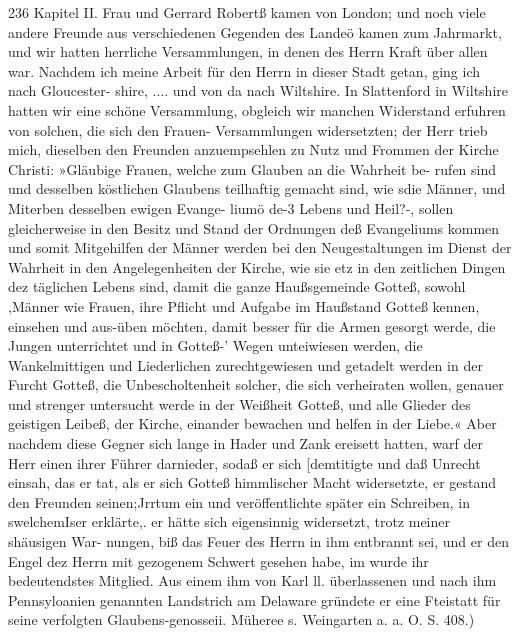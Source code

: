 236 Kapitel II.
Frau und Gerrard Robertß kamen von London; und noch viele
andere Freunde aus verschiedenen Gegenden des Landeö kamen
zum Jahrmarkt, und wir hatten herrliche Versammlungen, in
denen des Herrn Kraft über allen war. Nachdem ich meine
Arbeit für den Herrn in dieser Stadt getan, ging ich nach Gloucester-
shire, .... und von da nach Wiltshire. In Slattenford in
Wiltshire hatten wir eine schöne Versammlung, obgleich wir
manchen Widerstand erfuhren von solchen, die sich den Frauen-
Versammlungen widersetzten; der Herr trieb mich, dieselben den
Freunden anzuempsehlen zu Nutz und Frommen der Kirche Christi:
»Gläubige Frauen, welche zum Glauben an die Wahrheit be-
rufen sind und desselben köstlichen Glaubens teilhaftig gemacht
sind, wie sdie Männer, und Miterben desselben ewigen Evange-
liumö de-3 Lebens und Heil?-, sollen gleicherweise in den Besitz
und Stand der Ordnungen deß Evangeliums kommen und somit
Mitgehilfen der Männer werden bei den Neugestaltungen im
Dienst der Wahrheit in den Angelegenheiten der Kirche, wie sie
etz in den zeitlichen Dingen dez täglichen Lebens sind, damit
die ganze Haußsgemeinde Gotteß, sowohl ,Männer wie Frauen,
ihre Pflicht und Aufgabe im Haußstand Gotteß kennen, einsehen
und aus-üben möchten, damit besser für die Armen gesorgt werde,
die Jungen unterrichtet und in Gotteß-’ Wegen unteiwiesen werden,
die Wankelmittigen und Liederlichen zurechtgewiesen und getadelt
werden in der Furcht Gotteß, die Unbescholtenheit solcher, die sich
verheiraten wollen, genauer und strenger untersucht werde in der
Weißheit Gotteß, und alle Glieder des geistigen Leibeß, der Kirche,
einander bewachen und helfen in der Liebe.« Aber nachdem diese
Gegner sich lange in Hader und Zank ereisett hatten, warf der
Herr einen ihrer Führer darnieder, sodaß er sich [demtitigte und
daß Unrecht einsah, das er tat, als er sich Gotteß himmlischer
Macht widersetzte, er gestand den Freunden seinen;Jrrtum ein
und veröffentlichte später ein Schreiben, in swelchemIser erklärte,.
er hätte sich eigensinnig widersetzt, trotz meiner shäusigen War-
nungen, biß das Feuer des Herrn in ihm entbrannt sei, und er
den Engel dez Herrn mit gezogenem Schwert gesehen habe, im
wurde ihr bedeutendstes Mitglied. Aus einem ihm von Karl ll. überlassenen
und nach ihm Pennsyloanien genannten Landstrich am Delaware gründete er
eine Fteistatt für seine verfolgten Glaubens-genosseii. Müheree s. Weingarten
a. a. O. S. 408.)


